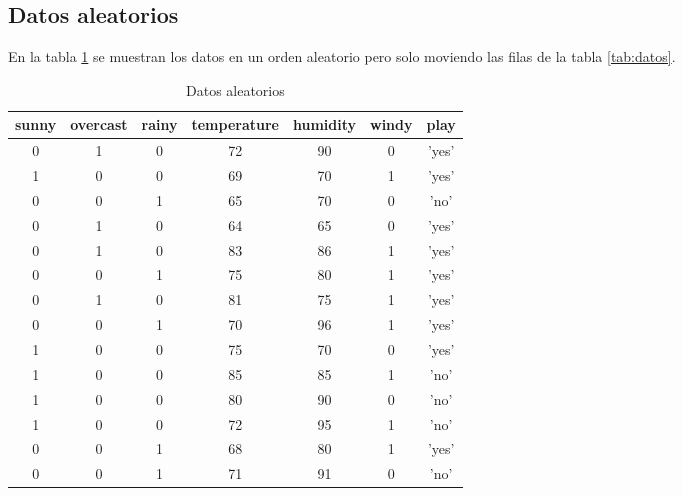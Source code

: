 \subsection{Datos aleatorios} \label{subsec:Datos aleatorios}

En la tabla \ref{tab:datos_aleatorios} se muestran los datos en un orden aleatorio pero solo moviendo las filas de la tabla \ref{tab:datos}.

\begin{table}[ht]
    \centering
    \caption{Datos aleatorios}
    \label{tab:datos_aleatorios}
    \begin{tabular}{|c|c|c|c|c|c|c|}
    \hline
    sunny & overcast & rainy & temperature & humidity & windy & play \\
    \hline
    0 & 1 & 0 & 72 & 90 & 0 & 'yes' \\
    1 & 0 & 0 & 69 & 70 & 1 & 'yes' \\
    0 & 0 & 1 & 65 & 70 & 0 & 'no' \\
    0 & 1 & 0 & 64 & 65 & 0 & 'yes' \\
    0 & 1 & 0 & 83 & 86 & 1 & 'yes' \\
    0 & 0 & 1 & 75 & 80 & 1 & 'yes' \\
    0 & 1 & 0 & 81 & 75 & 1 & 'yes' \\
    0 & 0 & 1 & 70 & 96 & 1 & 'yes' \\
    1 & 0 & 0 & 75 & 70 & 0 & 'yes' \\
    1 & 0 & 0 & 85 & 85 & 1 & 'no' \\
    1 & 0 & 0 & 80 & 90 & 0 & 'no' \\
    1 & 0 & 0 & 72 & 95 & 1 & 'no' \\
    0 & 0 & 1 & 68 & 80 & 1 & 'yes' \\
    0 & 0 & 1 & 71 & 91 & 0 & 'no' \\
    \hline
    \end{tabular}
\end{table}
